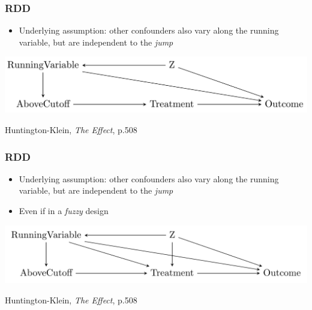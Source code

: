 \documentclass[aspectratio=43]{beamer}
\begin{document}
\begin{frame}
\frametitle{RDD}
\centering

\begin{itemize}
  \item Underlying assumption: other confounders also vary along the running variable, but are independent to the \textit{jump}
\end{itemize}

\vspace{50pt}

\includegraphics[width = \textwidth]{../img/rdd_dag}

{\scriptsize Huntington-Klein, \textit{The Effect}, p.508}

\end{frame}

\begin{frame}
\frametitle{RDD}
\centering

\begin{itemize}
  \item Underlying assumption: other confounders also vary along the running variable, but are independent to the \textit{jump}
  \item Even if in a \textit{fuzzy} design
\end{itemize}

\vspace{30pt}

\includegraphics[width = \textwidth]{../img/rdd_dag_fuzzy}

{\scriptsize Huntington-Klein, \textit{The Effect}, p.508}

\end{frame}
\end{document}
